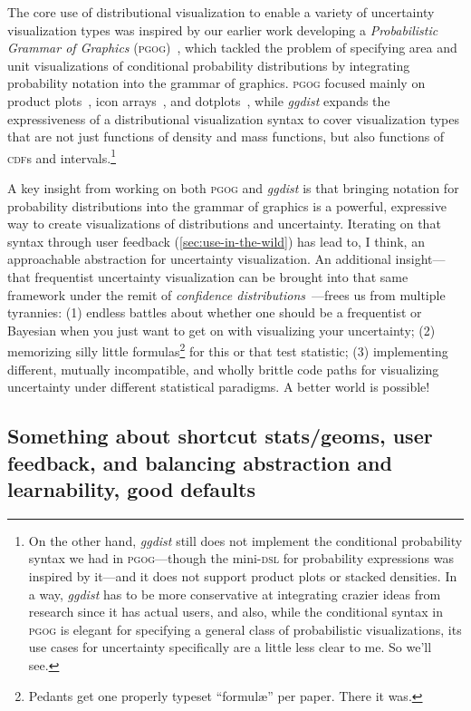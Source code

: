 \documentclass[journal]{vgtc}                     %
\begin{document}
The core use of distributional visualization to enable a variety of uncertainty visualization types was inspired by our earlier work developing a \textit{Probabilistic Grammar of Graphics} (\textsc{pgog})~\cite{pu2020probabilistic}, which tackled the problem of specifying area and unit visualizations of conditional probability distributions by integrating probability notation into the grammar of graphics. \textsc{pgog} focused mainly on product plots~\cite{wickham2011product}, icon arrays~\cite{ancker2006design}, and dotplots~\cite{wilkinson1999dot}, while \textit{ggdist} expands the expressiveness of a distributional visualization syntax to cover visualization types that are not just functions of density and mass functions, but also functions of \textsc{cdf}s and intervals.\footnote{On the other hand, \textit{ggdist} still does not implement the conditional probability syntax we had in \textsc{pgog}---though the mini-\textsc{dsl} for probability expressions was inspired by it---and it does not support product plots or stacked densities. In a way, \textit{ggdist} has to be more conservative at integrating crazier ideas from research since it has actual users, and also, while the conditional syntax in \textsc{pgog} is elegant for specifying a general class of probabilistic visualizations, its use cases for uncertainty specifically are a little less clear to me. So we'll see.} 

A key insight from working on both \textsc{pgog} and \textit{ggdist} is that bringing notation for probability distributions into the grammar of graphics is a powerful, expressive way to create visualizations of distributions and uncertainty. Iterating on that syntax through user feedback 
(\cref{sec:use-in-the-wild}) has lead to, I think, an approachable abstraction for uncertainty visualization. An additional insight---that frequentist uncertainty visualization can be brought into that same framework under the remit of \textit{confidence distributions}~\cite{xie2013confidence}---frees us from multiple tyrannies: (1) endless battles about whether one should be a frequentist or Bayesian when you just want to get on with visualizing your uncertainty; (2) memorizing silly little formulas\footnote{Pedants get one properly typeset ``formul\ae'' per paper. There it was.} for this or that test statistic; (3) implementing different, mutually incompatible, and wholly brittle code paths for visualizing uncertainty under different statistical paradigms. A better world is possible!

\subsection{Something about shortcut stats/geoms, user feedback, and balancing abstraction and learnability, good defaults}
\end{document}
